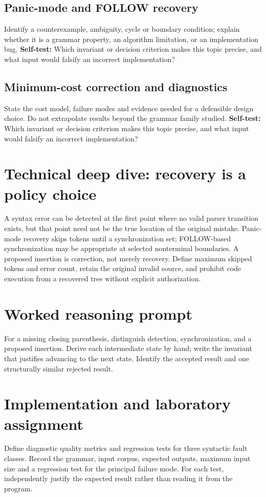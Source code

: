 \documentclass[11pt,letterpaper]{article}
\begin{document}
\subsection{Panic-mode and FOLLOW recovery}
Identify a counterexample, ambiguity, cycle or boundary condition; explain whether it is a grammar property, an algorithm limitation, or an implementation bug.
\textbf{Self-test:} Which invariant or decision criterion makes this topic precise, and what input would falsify an incorrect implementation?
\subsection{Minimum-cost correction and diagnostics}
State the cost model, failure modes and evidence needed for a defensible design choice. Do not extrapolate results beyond the grammar family studied.
\textbf{Self-test:} Which invariant or decision criterion makes this topic precise, and what input would falsify an incorrect implementation?
\section{Technical deep dive: recovery is a policy choice}
A syntax error can be detected at the first point where no valid parser transition exists, but that point need not be the true location of the original mistake. Panic-mode recovery skips tokens until a synchronization set; FOLLOW-based synchronization may be appropriate at selected nonterminal boundaries. A proposed insertion is correction, not merely recovery. Define maximum skipped tokens and error count, retain the original invalid source, and prohibit code execution from a recovered tree without explicit authorization.
\section{Worked reasoning prompt}
For a missing closing parenthesis, distinguish detection, synchronization, and a proposed insertion. Derive each intermediate state by hand; write the invariant that justifies advancing to the next state. Identify the accepted result and one structurally similar rejected result.
\section{Implementation and laboratory assignment}
Define diagnostic quality metrics and regression tests for three syntactic fault classes. Record the grammar, input corpus, expected outputs, maximum input size and a regression test for the principal failure mode. For each test, independently justify the expected result rather than reading it from the program.
\end{document}
